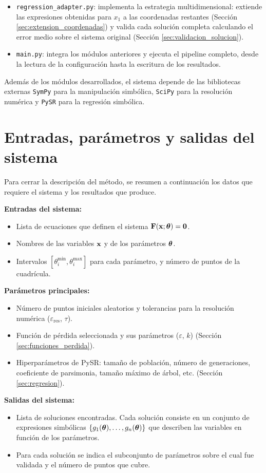 \begin{itemize}
    \item \texttt{regression\_adapter.py}: implementa la estrategia multidimensional: extiende las expresiones obtenidas para \(x_1\) a las coordenadas restantes (Sección \ref{sec:extension_coordenadas}) y valida cada solución completa calculando el error medio sobre el sistema original (Sección \ref{sec:validacion_solucion}).

    \item \texttt{main.py}: integra los módulos anteriores y ejecuta el pipeline completo, desde la lectura de la configuración hasta la escritura de los resultados. \end{itemize}

Además de los módulos desarrollados, el sistema depende de las bibliotecas externas \texttt{SymPy} para la manipulación simbólica, \texttt{SciPy} para la resolución numérica y \texttt{PySR} para la regresión simbólica.

\section{Entradas, parámetros y salidas del sistema} \label{sec:entradas_salidas_anexo}

Para cerrar la descripción del método, se resumen a continuación los datos que requiere el sistema y los resultados que produce.

\textbf{Entradas del sistema:} \begin{itemize} \item Lista de ecuaciones que definen el sistema \(\mathbf{F}(\mathbf{x}; \boldsymbol{\theta}) = \mathbf{0}\). \item Nombres de las variables \(\mathbf{x}\) y de los parámetros \(\boldsymbol{\theta}\). \item Intervalos \([\theta_i^{\min}, \theta_i^{\max}]\) para cada parámetro, y número de puntos de la cuadrícula. \end{itemize}

\textbf{Parámetros principales:} \begin{itemize} \item Número de puntos iniciales aleatorios y tolerancias para la resolución numérica (\(\varepsilon_{\text{res}}\), \(\tau\)). \item Función de pérdida seleccionada y sus parámetros (\(\varepsilon\), \(k\)) (Sección \ref{sec:funciones_perdida}). \item Hiperparámetros de PySR: tamaño de población, número de generaciones, coeficiente de parsimonia, tamaño máximo de árbol, etc. (Sección \ref{sec:regresion}). \end{itemize}

\textbf{Salidas del sistema:} \begin{itemize} \item Lista de soluciones encontradas. Cada solución consiste en un conjunto de expresiones simbólicas \(\{g_1(\boldsymbol{\theta}), \dots, g_n(\boldsymbol{\theta})\}\) que describen las variables en función de los parámetros. \item Para cada solución se indica el subconjunto de parámetros sobre el cual fue validada y el número de puntos que cubre. \end{itemize}
